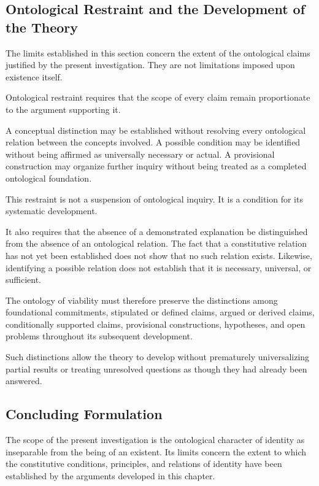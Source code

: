 \subsection{Ontological Restraint and the Development of the Theory}

The limits established in this section concern the
extent of the ontological claims justified by the
present investigation. They are not limitations
imposed upon existence itself.

Ontological restraint requires that the scope of every
claim remain proportionate to the argument supporting it.

A conceptual distinction may be established without
resolving every ontological relation between the
concepts involved. A possible condition may be
identified without being affirmed as universally
necessary or actual. A provisional construction may
organize further inquiry without being treated as a
completed ontological foundation.

This restraint is not a suspension of ontological
inquiry. It is a condition for its systematic development.

It also requires that the absence of a demonstrated
explanation be distinguished from the absence of an
ontological relation. The fact that a constitutive
relation has not yet been established does not show
that no such relation exists. Likewise, identifying
a possible relation does not establish that it is
necessary, universal, or sufficient.

The ontology of viability must therefore preserve
the distinctions among foundational commitments,
stipulated or defined claims, argued or derived claims,
conditionally supported claims, provisional constructions,
hypotheses, and open problems throughout its subsequent
development.

Such distinctions allow the theory to develop without
prematurely universalizing partial results or treating
unresolved questions as though they had already been
answered.

\subsection{Concluding Formulation}

The scope of the present investigation is the
ontological character of identity as inseparable from
the being of an existent. Its limits concern the extent
to which the constitutive conditions, principles, and
relations of identity have been established by the
arguments developed in this chapter.

